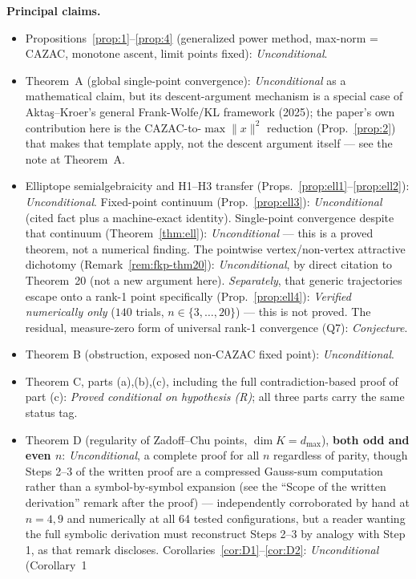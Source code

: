 \documentclass[11pt]{article}
\theoremstyle{plain}
\theoremstyle{definition}
\theoremstyle{remark}
\begin{document}
\textbf{Principal claims.}
\begin{itemize}
\item Propositions~\ref{prop:1}--\ref{prop:4} (generalized power method,
max-norm = CAZAC, monotone ascent, limit points fixed): \emph{Unconditional}.
\item Theorem~A (global single-point convergence): \emph{Unconditional}
as a mathematical claim, but its descent-argument mechanism is a special
case of Akta\c{s}--Kroer's \cite{AK25} general Frank-Wolfe/KL framework
(2025); the paper's own contribution here is the CAZAC-to-$\max\|x\|^2$
reduction (Prop.~\ref{prop:2}) that makes that template apply, not the
descent argument itself --- see the note at Theorem~A.
\item Elliptope semialgebraicity and H1--H3 transfer
(Props.~\ref{prop:ell1}--\ref{prop:ell2}): \emph{Unconditional}. Fixed-point
continuum (Prop.~\ref{prop:ell3}): \emph{Unconditional} (cited fact plus a
machine-exact identity). Single-point convergence despite that continuum
(Theorem~\ref{thm:ell}): \emph{Unconditional} --- this is a proved theorem,
not a numerical finding. The pointwise vertex/non-vertex attractive
dichotomy (Remark~\ref{rem:fkp-thm20}): \emph{Unconditional}, by direct
citation to \cite{FKP21} Theorem~20 (not a new argument here).
\emph{Separately}, that generic trajectories escape onto a rank-1 point
specifically (Prop.~\ref{prop:ell4}): \emph{Verified numerically only}
($140$ trials, $n\in\{3,\dots,20\}$) --- this is not proved. The residual,
measure-zero form of universal rank-1 convergence (Q7): \emph{Conjecture}.
\item Theorem B (obstruction, exposed non-CAZAC fixed point):
\emph{Unconditional}.
\item Theorem C, parts (a),(b),(c), including the full contradiction-based
proof of part (c): \emph{Proved conditional on hypothesis (R)}; all three
parts carry the same status tag.
\item Theorem D (regularity of Zadoff--Chu points, $\dim K=d_{\max}$),
\textbf{both odd and even $n$}: \emph{Unconditional}, a complete proof for
all $n$ regardless of parity, though Steps 2--3 of the written proof are a
compressed Gauss-sum computation rather than a symbol-by-symbol expansion
(see the ``Scope of the written derivation'' remark after the proof) ---
independently corroborated by hand at $n=4,9$ and numerically at all 64
tested configurations, but a reader wanting the full symbolic derivation
must reconstruct Steps 2--3 by analogy with Step 1, as that remark
discloses.
Corollaries~\ref{cor:D1}--\ref{cor:D2}: \emph{Unconditional} (Corollary~1

\end{itemize}
\end{document}
